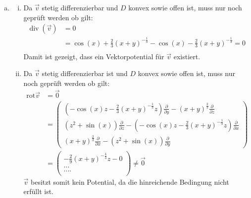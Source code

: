 \documentclass[10pt,a4paper,parskip=half]{scrartcl}
\begin{document}
\begin{enumerate}[(a)]
\item 
\begin{enumerate}[(i)]
	\item 
Da $\vec v$ stetig differenzierbar und $D$ konvex sowie offen ist, muss nur noch geprüft werden ob gilt:
\begin{align*}
\operatorname{div} ( \vec v ) &= 0\\
&= \cos(x) + \frac 23(x+y)^{-\frac 13} - \cos (x) - \frac 23(x+y)^{-\frac 13} = 0\\
\end{align*}
Damit ist gezeigt, dass ein Vektorpotential für $\vec v$ existiert.
\item 
Da $\vec v$ stetig differenzierbar ist und $D$ konvex sowie offen ist, muss nur noch geprüft werden ob gilt:
\begin{align*}
\text{rot} \vec v &= \vec 0\\
&= \begin{pmatrix}
\left(-\cos(x)z-\frac 23(x+y)^{-\frac 13}z \right)\frac {\partial}{\partial y} - (x+y)^{\frac 23} \frac{\partial}{\partial z} \\
\left(z^2  + \sin(x)\right) \frac{\partial}{\partial z} -\left(-\cos(x)z-\frac 23(x+y)^{-\frac 13}z \right) \frac{\partial}{\partial x}\\
(x+y)^{\frac 23} \frac{\partial}{\partial x} - \left( z^2 + \sin(x) \right) \frac{\partial}{\partial y}
\end{pmatrix}\\
&= \begin{pmatrix}
-\frac 29(x+y)^{-\frac 43}z -0 \\
...\\
....\\
\end{pmatrix} \neq \vec 0
\end{align*}
$\vec v$ besitzt somit kein Potential, da die hinreichende Bedingung nicht erfüllt ist.
\end{enumerate}
\end{enumerate}
\end{document}
